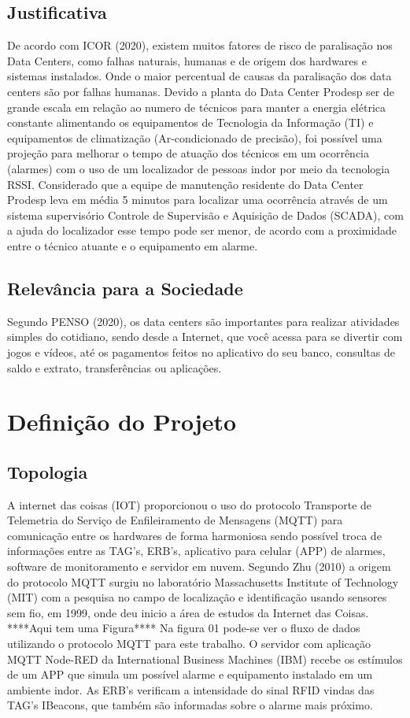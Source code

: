 \documentclass[
	article,			%
	12pt,				%
	oneside,			%
	a4paper,			%
	english,			%
	brazil,				%
	sumario=tradicional
	]{abntex2}
\begin{document}
\subsection{Justificativa}
De acordo com ICOR (2020), existem muitos fatores de risco de paralisação nos Data Centers, como falhas naturais, humanas e de origem dos hardwares e sistemas instalados. Onde o maior percentual de causas da paralisação dos data centers são por falhas humanas. 
Devido a planta do Data Center Prodesp ser de grande escala em relação ao numero de técnicos para manter a energia elétrica constante alimentando os equipamentos de Tecnologia da Informação (TI) e equipamentos de climatização (Ar-condicionado de precisão), foi possível uma projeção para melhorar o tempo de atuação dos técnicos em um ocorrência (alarmes) com o uso de um localizador de pessoas indor por meio da tecnologia RSSI.
Considerado que a equipe de manutenção residente do Data Center Prodesp leva em média 5 minutos para localizar uma ocorrência através de um sistema supervisório Controle de Supervisão e Aquisição de Dados (SCADA), com a ajuda do localizador esse tempo pode ser menor, de acordo com a proximidade entre o técnico atuante e o equipamento em alarme. 
\subsection{Relevância para a Sociedade}
Segundo PENSO (2020), os data centers são importantes para realizar atividades simples do cotidiano, sendo desde a Internet, que você acessa para se divertir com jogos e vídeos, até os pagamentos feitos no aplicativo do seu banco, consultas de saldo e extrato, transferências ou aplicações.

\section{Definição do Projeto}
\subsection{Topologia}
A internet das coisas (IOT) proporcionou o uso do protocolo Transporte de Telemetria do Serviço de Enfileiramento de Mensagens (MQTT) para comunicação entre os hardwares de forma harmoniosa sendo possível troca de informações entre as TAG’s, ERB’s, aplicativo para celular (APP) de alarmes, software de monitoramento e servidor em nuvem. 
Segundo Zhu (2010) a origem do protocolo MQTT surgiu no laboratório Massachusetts Institute of Technology (MIT) com a pesquisa no campo de localização e identificação usando sensores sem fio, em 1999, onde deu inicio a área de estudos da Internet das Coisas.
****Aqui tem uma Figura****
Na figura 01 pode-se ver o fluxo de dados utilizando o protocolo MQTT para este trabalho.
O servidor com aplicação MQTT Node-RED da International Business Machines (IBM) recebe os estímulos de um APP que simula um possível alarme e equipamento instalado em um ambiente indor. As ERB’s verificam a intensidade do sinal RFID vindas das TAG’s IBeacons, que também são informadas sobre o alarme mais próximo.
\end{document}
